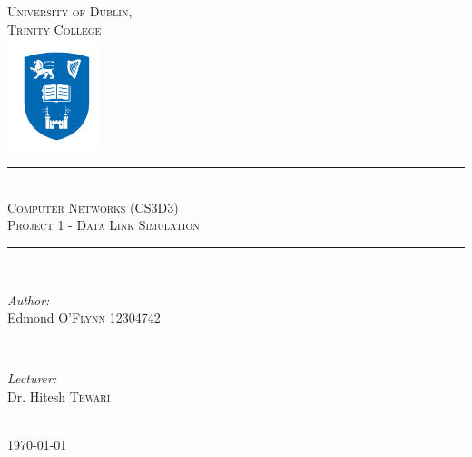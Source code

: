 \documentclass[12pt]{article}
\begin{document}


\begin{titlepage}

\newcommand{\HRule}{\rule{\linewidth}{0.5mm}}

\center
\textsc{\LARGE University of Dublin,\\Trinity College}\\[1.0cm]
\includegraphics[width=0.2\textwidth]{logo.png}

\HRule \\[0.4cm]
\textsc{\Large Computer Networks (CS3D3)}\\[0.25cm]
\textsc{\large Project 1 - Data Link Simulation}\\[0.1cm]
\HRule \\[0.4cm]
 
\begin{minipage}{0.5\textwidth}
\begin{flushleft} \large
\emph{Author:} \\
Edmond \textsc{O'Flynn} 12304742
\end{flushleft}
\end{minipage}
~
\begin{minipage}{0.4\textwidth}
\begin{flushleft} 
\large
\emph{Lecturer:} \\
Dr. Hitesh \textsc{Tewari} 
\end{flushleft}
\end{minipage}\\[5cm]

{\large \today}\\[1cm] 

\clearpage
\end{titlepage}
\end{document}
